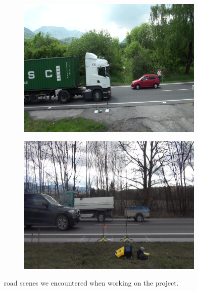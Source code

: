 \begin{figure}[!t]
    \centering
    \begin{subfigure}[b]{0.3\textwidth}
        \centering
        \includegraphics[width=\textwidth]{figures/siamese_tracking/interreg_sample_01.jpg}
        \caption[]{}
    \end{subfigure}
    \begin{subfigure}[b]{0.3\textwidth}
        \centering
        \includegraphics[width=\textwidth]{figures/siamese_tracking/interreg_sample_02.jpg}
        \caption[]{}
    \end{subfigure}
    \caption[interreg dataset sample]{road scenes we encountered when working on the \interreg{} project.}
    \label{fig:InterregDatasetSample}
\end{figure}

